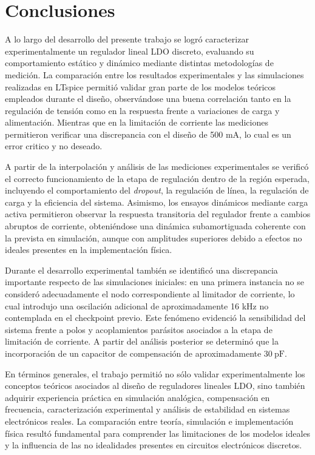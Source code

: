 
\section{Conclusiones}

A lo largo del desarrollo del presente trabajo se logró caracterizar experimentalmente un regulador lineal LDO discreto, evaluando su comportamiento estático y dinámico mediante distintas metodologías de medición. La comparación entre los resultados experimentales y las simulaciones realizadas en LTspice permitió validar gran parte de los modelos teóricos empleados durante el diseño, observándose una buena correlación tanto en la regulación de tensión como en la respuesta frente a variaciones de carga y alimentación. Mientras que en la limitación de corriente las mediciones permitieron verificar una discrepancia con el diseño de 500 mA, lo cual es un error critico y no deseado.

A partir de la interpolación y análisis de las mediciones experimentales se verificó el correcto funcionamiento de la etapa de regulación dentro de la región esperada, incluyendo el comportamiento del \textit{dropout}, la regulación de línea, la regulación de carga y la eficiencia del sistema. Asimismo, los ensayos dinámicos mediante carga activa permitieron observar la respuesta transitoria del regulador frente a cambios abruptos de corriente, obteniéndose una dinámica subamortiguada coherente con la prevista en simulación, aunque con amplitudes superiores debido a efectos no ideales presentes en la implementación física.

Durante el desarrollo experimental también se identificó una discrepancia importante respecto de las simulaciones iniciales: en una primera instancia no se consideró adecuadamente el nodo correspondiente al limitador de corriente, lo cual introdujo una oscilación adicional  de aproximadamente 16 kHz no contemplada en el checkpoint previo. Este fenómeno evidenció la sensibilidad del sistema frente a polos y acoplamientos parásitos asociados a la etapa de limitación de corriente. A partir del análisis posterior se determinó que la incorporación de un capacitor de compensación de aproximadamente $30\ \text{pF}$.

En términos generales, el trabajo permitió no sólo validar experimentalmente los conceptos teóricos asociados al diseño de reguladores lineales LDO, sino también adquirir experiencia práctica en simulación analógica, compensación en frecuencia, caracterización experimental y análisis de estabilidad en sistemas electrónicos reales. La comparación entre teoría, simulación e implementación física resultó fundamental para comprender las limitaciones de los modelos ideales y la influencia de las no idealidades presentes en circuitos electrónicos discretos.
